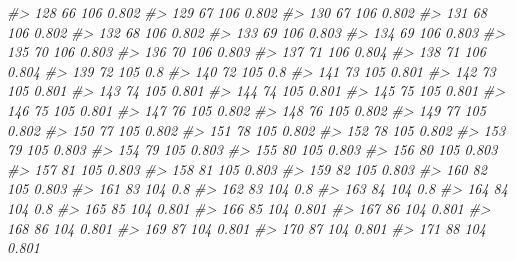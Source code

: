 \documentclass[
]{book}
\newenvironment{Shaded}{\begin{snugshade}}{\end{snugshade}}
\newcommand{\CommentTok}[1]{\textcolor[rgb]{0.56,0.35,0.01}{\textit{#1}}}
\begin{document}
\begin{Shaded}
\begin{Highlighting}[]
\CommentTok{\#\textgreater{} 128         66      106 0.802}
\CommentTok{\#\textgreater{} 129         67      106 0.802}
\CommentTok{\#\textgreater{} 130         67      106 0.802}
\CommentTok{\#\textgreater{} 131         68      106 0.802}
\CommentTok{\#\textgreater{} 132         68      106 0.802}
\CommentTok{\#\textgreater{} 133         69      106 0.803}
\CommentTok{\#\textgreater{} 134         69      106 0.803}
\CommentTok{\#\textgreater{} 135         70      106 0.803}
\CommentTok{\#\textgreater{} 136         70      106 0.803}
\CommentTok{\#\textgreater{} 137         71      106 0.804}
\CommentTok{\#\textgreater{} 138         71      106 0.804}
\CommentTok{\#\textgreater{} 139         72      105   0.8}
\CommentTok{\#\textgreater{} 140         72      105   0.8}
\CommentTok{\#\textgreater{} 141         73      105 0.801}
\CommentTok{\#\textgreater{} 142         73      105 0.801}
\CommentTok{\#\textgreater{} 143         74      105 0.801}
\CommentTok{\#\textgreater{} 144         74      105 0.801}
\CommentTok{\#\textgreater{} 145         75      105 0.801}
\CommentTok{\#\textgreater{} 146         75      105 0.801}
\CommentTok{\#\textgreater{} 147         76      105 0.802}
\CommentTok{\#\textgreater{} 148         76      105 0.802}
\CommentTok{\#\textgreater{} 149         77      105 0.802}
\CommentTok{\#\textgreater{} 150         77      105 0.802}
\CommentTok{\#\textgreater{} 151         78      105 0.802}
\CommentTok{\#\textgreater{} 152         78      105 0.802}
\CommentTok{\#\textgreater{} 153         79      105 0.803}
\CommentTok{\#\textgreater{} 154         79      105 0.803}
\CommentTok{\#\textgreater{} 155         80      105 0.803}
\CommentTok{\#\textgreater{} 156         80      105 0.803}
\CommentTok{\#\textgreater{} 157         81      105 0.803}
\CommentTok{\#\textgreater{} 158         81      105 0.803}
\CommentTok{\#\textgreater{} 159         82      105 0.803}
\CommentTok{\#\textgreater{} 160         82      105 0.803}
\CommentTok{\#\textgreater{} 161         83      104   0.8}
\CommentTok{\#\textgreater{} 162         83      104   0.8}
\CommentTok{\#\textgreater{} 163         84      104   0.8}
\CommentTok{\#\textgreater{} 164         84      104   0.8}
\CommentTok{\#\textgreater{} 165         85      104 0.801}
\CommentTok{\#\textgreater{} 166         85      104 0.801}
\CommentTok{\#\textgreater{} 167         86      104 0.801}
\CommentTok{\#\textgreater{} 168         86      104 0.801}
\CommentTok{\#\textgreater{} 169         87      104 0.801}
\CommentTok{\#\textgreater{} 170         87      104 0.801}
\CommentTok{\#\textgreater{} 171         88      104 0.801}

\end{Highlighting}
\end{Shaded}
\end{document}
